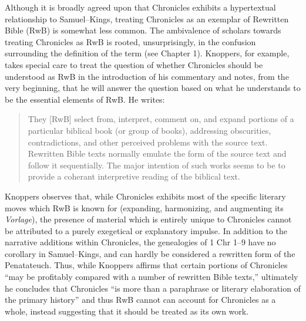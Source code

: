 Although it is broadly agreed upon that Chronicles exhibits a
hypertextual relationship to Samuel--Kings, treating Chronicles as an
exemplar of Rewritten Bible (RwB) is somewhat less
common.\autocites[Though, not particularly
\emph{un}common:][]{campbell_zsengeller2014}{zahn_lim-collins2010}{bernstein_textus2005}[Alexander
considers Chronicles to be a ``prototype'' of RwB,
see][100]{alexander_carson-williamson1988}[I have adopted the
terminology of hyper-/hypotext from Genette. In this case, to say that
Chronicles is a ``hypertext'' of Samuel--Kings is to say that it is
derivative, but not a commentary on Samuel--Kings. See][5]{genette1997}
The ambivalence of scholars towards treating Chronicles as RwB is
rooted, unsurprisingly, in the confusion surrounding the definition of
the term (see Chapter 1). Knoppers, for example, takes special care to
treat the question of whether Chronicles should be understood as RwB in
the introduction of his commentary and notes, from the very beginning,
that he will answer the question based on what he understands to be the
essential elements of RwB.\autocite[ , 129--134]{knoppers2003} He
writes:

\begin{quote}
They {[}RwB{]} select from, interpret, comment on, and expand portions
of a particular biblical book (or group of books), addressing
obscurities, contradictions, and other perceived problems with the
source text. Rewritten Bible texts normally emulate the form of the
source text and follow it sequentially. The major intention of such
works seems to be to provide a coherant interpretive reading of the
biblical text.\autocite[130]{knoppers2003}
\end{quote}

Knoppers observes that, while Chronicles exhibits most of the specific
literary moves which RwB is known for (expanding, harmonizing, and
augmenting its \emph{Vorlage}), the presence of material which is
entirely unique to Chronicles cannot be attributed to a purely
exegetical or explanatory impulse. In addition to the narrative
additions within Chronicles, the genealogies of 1 Chr 1--9 have no
corollary in Samuel--Kings, and can hardly be considered a rewritten
form of the Penatateuch.\autocite[132]{knoppers2003} Thus, while
Knoppers affirms that certain portions of Chronicles ``may be profitably
compared with a number of rewritten Bible
texts,''\autocite[131]{knoppers2003} ultimately he concludes that
Chronicles ``is more than a paraphrase or literary elaboration of the
primary history''\autocite[134]{knoppers2003} and thus RwB cannot can
account for Chronicles as a whole, instead suggesting that it should be
treated as its own work.\autocite[131--134]{knoppers2003}

